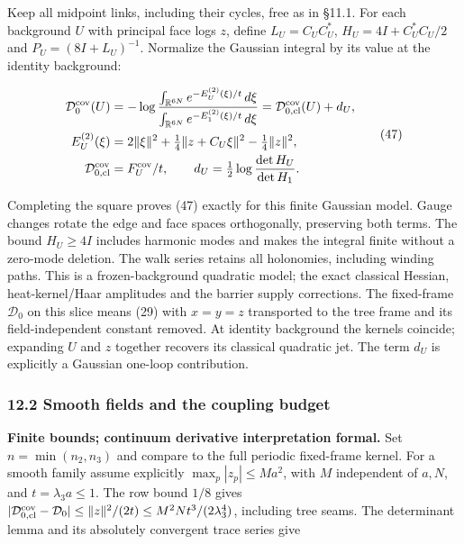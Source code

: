 \documentclass[11pt,a4paper]{article}
\begin{document}
Keep all midpoint links, including their cycles, free as in §11.1. For
each background \(U\) with principal face logs \(z\), define
\(L_U=C_UC_U^*\), \(H_U=4I+C_U^*C_U/2\) and \(P_U=(8I+L_U)^{-1}\).
Normalize the Gaussian integral by its value at the identity background:

\[\begin{aligned}
\mathcal D_0^{\rm cov}(U)&=-\log
\frac{\int_{\mathbb R^{6N}}e^{-E_U^{(2)}(\xi)/t}\,d\xi}
{\int_{\mathbb R^{6N}}e^{-E_1^{(2)}(\xi)/t}\,d\xi}
=\mathcal D_{0,\rm cl}^{\rm cov}(U)+d_U,\\
E_U^{(2)}(\xi)&=2\|\xi\|^2+\tfrac14\|z+C_U\xi\|^2-\tfrac14\|z\|^2,\\
\mathcal D_{0,\rm cl}^{\rm cov}&=F_U^{\rm cov}/t,
\qquad d_U=\tfrac12\log\frac{\det H_U}{\det H_1}.
\end{aligned}\tag{47}\]

Completing the square proves (47) exactly for this finite Gaussian
model. Gauge changes rotate the edge and face spaces orthogonally,
preserving both terms. The bound \(H_U\ge4I\) includes harmonic modes
and makes the integral finite without a zero-mode deletion. The walk
series retains all holonomies, including winding paths. This is a
frozen-background quadratic model; the exact classical Hessian,
heat-kernel/Haar amplitudes and the barrier supply corrections. The
fixed-frame \(\mathcal D_0\) on this slice means (29) with \(x=y=z\)
transported to the tree frame and its field-independent constant
removed. At identity background the kernels coincide; expanding \(U\)
and \(z\) together recovers its classical quadratic jet. The term
\(d_U\) is explicitly a Gaussian one-loop contribution.

\hypertarget{smooth-fields-and-the-coupling-budget}{%
\subsubsection{12.2 Smooth fields and the coupling
budget}\label{smooth-fields-and-the-coupling-budget}}

\textbf{Finite bounds; continuum derivative interpretation formal.} Set
\(n=\min(n_2,n_3)\) and compare to the full periodic fixed-frame kernel.
For a smooth family assume explicitly \(\max_p|z_p|\le Ma^2\), with
\(M\) independent of \(a,N\), and \(t=\lambda_3a\le1\). The row bound
\(1/8\) gives
\(|\mathcal D_{0,\rm cl}^{\rm cov}-\mathcal D_0| \le\|z\|^2/(2t)\le M^2Nt^3/(2\lambda_3^4)\),
including tree seams. The determinant lemma and its absolutely
convergent trace series give
\end{document}
